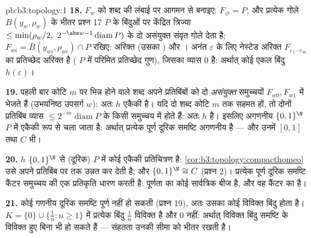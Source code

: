 \begin{solution}{pb:b3:topology:1}
\textbf{18.} $F_w$ को शब्द की लंबाई पर आगमन से बनाइए: $F_\varnothing = P$, और
प्रत्येक गोले $B(y_w, \rho_w)$ के भीतर प्रश्न 17 $P$ के बिंदुओं पर केंद्रित
त्रिज्या $\leq
\min(\rho_w/2,\ 2^{-\abs w-1}\operatorname{diam}P)$ के दो असंयुक्त संवृत गोले देता है; $F_{wi} = \bar B(y_{wi}, \rho_{wi})
\cap P$ रखिए: अरिक्त
(उसका ) और । अनंत $\varepsilon$ के लिए नेस्टेड अरिक्त  $F_{\varepsilon_1\cdots\varepsilon_m}$
का प्रतिच्छेद अरिक्त है ( $P$ में परिमित प्रतिच्छेद गुण),
जिसका व्यास $0$ है: अर्थात् कोई एकल बिंदु $h(\varepsilon)$।

\textbf{19.} पहली बार कोटि $m$ पर भिन्न होने वाले शब्द अपने
प्रतिबिंबों को दो \emph{असंयुक्त} समुच्चयों $F_{w0}, F_{w1}$ में भेजते हैं
(उभयनिष्ठ उपसर्ग $w$): अतः $h$ एकैकी है। यदि दो शब्द कोटि $m$
तक सहमत हों, तो दोनों प्रतिबिंब व्यास $\leq
2^{-m}\operatorname{diam}P$ के किसी समुच्चय में
होते हैं: अतः $h$  है। इसलिए अगणनीय $\{0,1\}^\N$ $P$ में एकैकी रूप
से चला जाता है: अर्थात् प्रत्येक पूर्ण  दूरिक समष्टि अगणनीय है
--- और उनमें $[0,1]$ तथा $C$ भी।

\textbf{20.} $h$  $\{0,1\}^\N$ से  (दूरिक) $P$ में कोई
 एकैकी प्रतिचित्रण है: \cref{cor:b3:topology:compacthomeo} उसे अपने प्रतिबिंब पर 
तक उन्नत कर देती है; और $\{0,1\}^\N \cong C$ (प्रश्न 2)। प्रत्येक पूर्ण  दूरिक
समष्टि कैंटर समुच्चय की एक प्रतिकृति धारण करती है: पूर्णता का कोई
सार्वत्रिक बीज है, और वह कैंटर का है।

\textbf{21.} कोई गणनीय  दूरिक समष्टि पूर्ण नहीं हो सकती (प्रश्न
19), अतः उसका कोई विविक्त बिंदु होता है। $K =
\{0\}\cup\{\frac1n : n \geq 1\}$ में प्रत्येक बिंदु
$\frac1n$ विविक्त है और $0$ नहीं: अर्थात् विविक्त बिंदु समष्टि के
विविक्त हुए बिना  भी हो सकते हैं --- संहतता उनकी सीमा को भीतर
रखती है।


\end{solution}

